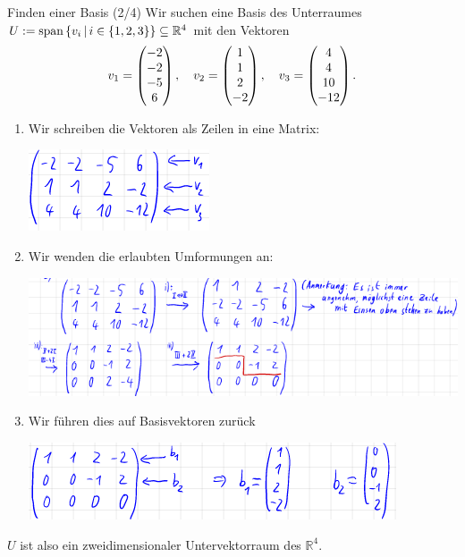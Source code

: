 \begin{Beispiel}
{Finden einer Basis (2/4)}
Wir suchen eine Basis des Unterraumes $U:=\text{span}\left\{v_i\,|\, i\in\{1,2,3\}\right\}\subseteq\mathbb{R}^4$ mit den Vektoren
\begin{equation*}
    v_1=\begin{pmatrix}-2\\-2\\-5\\6\end{pmatrix},\quad v_2=\begin{pmatrix}1\\1\\2\\-2\end{pmatrix},\quad v_3=\begin{pmatrix}4\\4\\10\\-12\end{pmatrix}.
\end{equation*}
\begin{enumerate}
    \item Wir schreiben die Vektoren als Zeilen in eine Matrix:
\begin{center}
    \includegraphics[width=.2\textwidth]{Dateien/00/11GaussB1.PNG}
\end{center}
    \item Wir wenden die erlaubten Umformungen an:
\begin{center}
    \includegraphics[width=.7\textwidth]{Dateien/00/11GaussB2.PNG}
\end{center}
    \item Wir führen dies auf Basisvektoren zurück
\begin{center}
    \includegraphics[width=.6\textwidth]{Dateien/00/11GaussB3.PNG}
\end{center}
\end{enumerate}
$U$ ist also ein zweidimensionaler Untervektorraum des $\mathbb{R}^4$.\\
\end{Beispiel}
